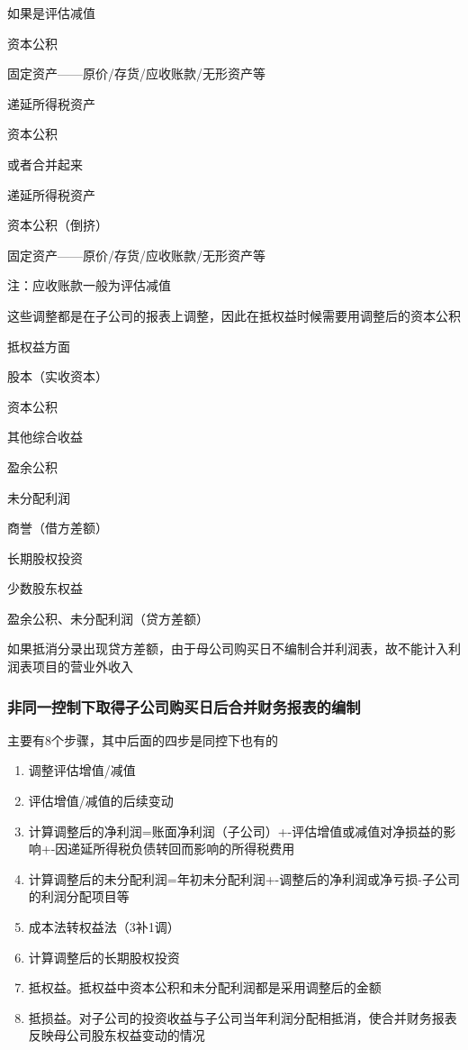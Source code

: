\documentclass[UTF8,12pt]{ctexart}
\newenvironment{Dr}{%
	\begin{list}{}%
		{
			\setlength{\leftmargin}{2em}
			\setlength{\labelwidth}{2em}
			\setlength{\labelsep}{0pt}
			\setlength{\itemindent}{0pt}
			\setlength{\listparindent}{0pt}
			\setlength{\parsep}{0pt}
			\setlength{\topsep}{0pt}
		}
		\item[\textbf{借：}]
	}{%
	\end{list}
}
\newenvironment{Cr}{%
	\begin{list}{}%
		{
			\setlength{\leftmargin}{3em}
			\setlength{\labelwidth}{2em}
			\setlength{\labelsep}{0pt}
			\setlength{\itemindent}{0pt}
			\setlength{\listparindent}{0pt}
			\setlength{\parsep}{0pt}
			\setlength{\topsep}{0pt}
		}
		\item[\textbf{贷：}]
	}{%
	\end{list}
}
\numberwithin{equation}{section} %
\numberwithin{figure}{section}
\numberwithin{table}{section}
\begin{document}
	如果是评估减值
	\begin{Dr}
		资本公积
	\end{Dr}
	\begin{Cr}
		固定资产——原价/存货/应收账款/无形资产等
	\end{Cr}
	\begin{Dr}
		递延所得税资产
	\end{Dr}
	\begin{Cr}
		资本公积
	\end{Cr}
	
	或者合并起来
	\begin{Dr}
		递延所得税资产 
		
		资本公积（倒挤）
	\end{Dr}
	\begin{Cr}
		固定资产——原价/存货/应收账款/无形资产等
	\end{Cr}
	注：应收账款一般为评估减值
	
	这些调整都是在子公司的报表上调整，因此在抵权益时候需要用调整后的资本公积
	
	抵权益方面
	\begin{Dr}
		股本（实收资本）
		
		资本公积
		
		其他综合收益
		
		盈余公积
		
		未分配利润
		
		商誉（借方差额）
	\end{Dr}
	\begin{Cr}
		长期股权投资
		
		少数股东权益
		
		盈余公积、未分配利润（贷方差额）
	\end{Cr}
	如果抵消分录出现贷方差额，由于母公司购买日不编制合并利润表，故不能计入利润表项目的营业外收入
	\subsubsection{非同一控制下取得子公司购买日后合并财务报表的编制}
	主要有8个步骤，其中后面的四步是同控下也有的
	\begin{enumerate}
		\item 调整评估增值/减值
		
		\item 评估增值/减值的后续变动
		
		\item 计算调整后的净利润=账面净利润（子公司）+-评估增值或减值对净损益的影响+-因递延所得税负债转回而影响的所得税费用
		
		\item 计算调整后的未分配利润=年初未分配利润+-调整后的净利润或净亏损-子公司的利润分配项目等
		
		\item 成本法转权益法（3补1调）
		
		\item 计算调整后的长期股权投资
		
		\item 抵权益。抵权益中资本公积和未分配利润都是采用调整后的金额
		
		\item 抵损益。对子公司的投资收益与子公司当年利润分配相抵消，使合并财务报表反映母公司股东权益变动的情况
	\end{enumerate}
	
\end{document}
